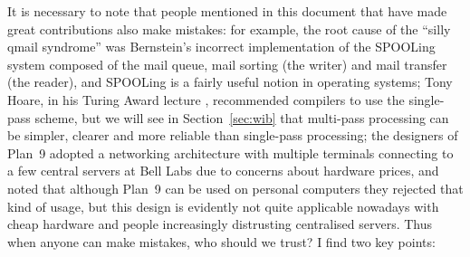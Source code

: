 It is necessary to note that people mentioned in this document that have made
great contributions also make mistakes: for example, the root cause of the
``silly qmail syndrome'' was Bernstein's incorrect
implementation of the SPOOLing system composed of the mail queue, mail
sorting (the writer) and mail transfer (the reader), and SPOOLing is a fairly
useful notion in operating systems; Tony Hoare, in his Turing Award lecture%
, recommended compilers to use the single-pass scheme,
but we will see in Section~\ref{sec:wib} that multi-pass processing can be
simpler, clearer and more reliable than single-pass processing; the designers
of Plan~9 adopted a networking architecture with multiple terminals connecting
to a few central servers at Bell Labs due to concerns about hardware prices,
and noted that although Plan~9 can be used on personal computers they rejected
that kind of usage, but this design is evidently not quite
applicable nowadays with cheap hardware and people increasingly distrusting
centralised servers.  Thus when anyone can make mistakes,
who should we trust?  I find two key points:

